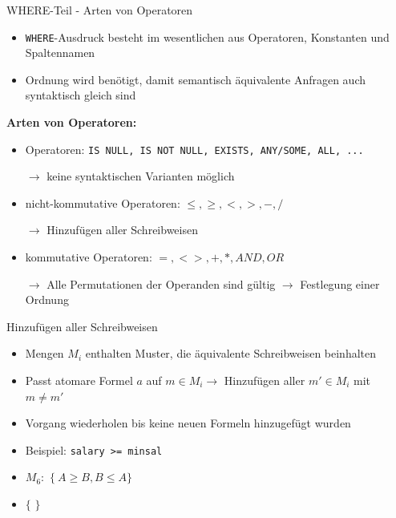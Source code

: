 \documentclass{beamer}
\begin{document}
\begin{frame}[fragile]{WHERE-Teil - Arten von Operatoren}
\begin{itemize}
\item \verb|WHERE|-Ausdruck besteht im wesentlichen aus Operatoren, Konstanten und Spaltennamen
\item Ordnung wird benötigt, damit semantisch äquivalente Anfragen auch syntaktisch gleich sind
\end{itemize}\pause
\textbf{Arten von Operatoren:}
\begin{itemize}
\item Operatoren: \verb|IS NULL, IS NOT NULL, EXISTS, ANY/SOME, ALL, ...|
\item[$\to$] keine syntaktischen Varianten möglich
\item nicht-kommutative Operatoren: $\leq,\geq,<,>,-,/$
\item[$\to$] Hinzufügen aller Schreibweisen
\item kommutative Operatoren: $=,<>,+,*,AND,OR$
\item[$\to$] Alle Permutationen der Operanden sind gültig $\to$ Festlegung einer Ordnung
\end{itemize}

\end{frame}





\begin{frame}[fragile]{Hinzufügen aller Schreibweisen}
\begin{itemize}
\item Mengen $M_i$ enthalten Muster, die äquivalente Schreibweisen beinhalten
\item Passt atomare Formel $a$ auf $m\in M_i \to$ Hinzufügen aller $m'\in M_i$ mit $m\neq m'$
\item Vorgang wiederholen bis keine neuen Formeln hinzugefügt wurden
\item Beispiel: \verb|salary >= minsal|
\item $M_6:$  $\{\ A\geq B, B\leq A \}$
\item  $\{$    $\}$ 
\end{itemize}
\end{frame}
\end{document}
